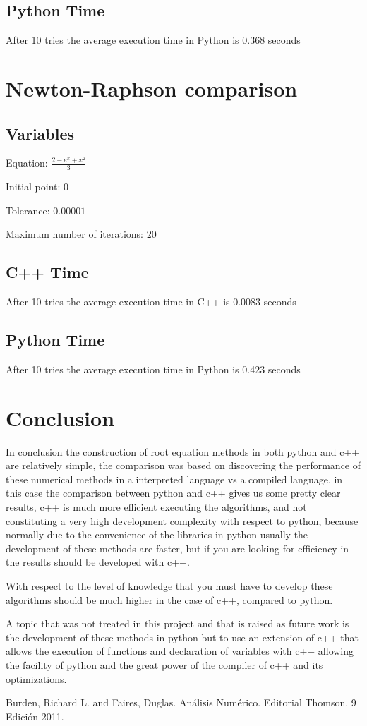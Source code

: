 \documentclass[conference]{IEEEtran}
\begin{document}
\subsection{Python Time}
After 10 tries the average execution time in Python is 0.368 seconds

\section{Newton-Raphson comparison}
\subsection{Variables}

Equation: \( \frac{2 - e^x + x^2}{3}   \) 

Initial point: \(0\)

Tolerance: \(0.00001\) 

Maximum number of iterations: \(20\)

\subsection{C++ Time}
After 10 tries the average execution time in C++ is 0.0083 seconds

\subsection{Python Time}
After 10 tries the average execution time in Python is 0.423 seconds


\section{Conclusion}
In conclusion the construction of root equation methods in both python and c++ are relatively simple, the comparison was based on discovering the performance of these numerical methods in a interpreted language vs a compiled language, in this case the comparison between python and c++ gives us some pretty clear results, c++ is much more efficient executing the algorithms, and not constituting a very high development complexity with respect to python, because normally due to the convenience of the libraries in python usually the development of these methods are faster, but if you are looking for efficiency in the results should be developed with c++. 

With respect to the level of knowledge that you must have to develop these algorithms should be much higher in the case of c++, compared to python. 

A topic that was not treated in this project and that is raised as future work is the development of these methods in python but to use an extension of c++ that allows the execution of functions and declaration of variables with c++ allowing the facility of python and the great power of the compiler of c++ and its optimizations. 

\begin{thebibliography}{00}
 Burden, Richard L. and Faires, Duglas. Análisis Numérico. Editorial Thomson. 9 Edición 2011.
\end{thebibliography}
\end{document}
